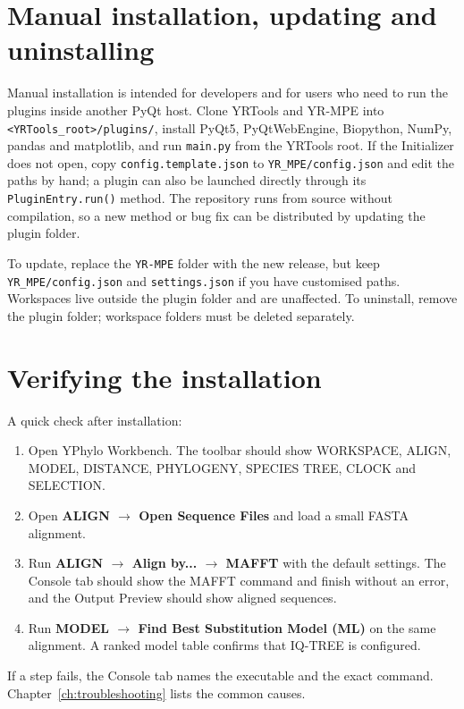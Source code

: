 \documentclass[10pt]{report}
\begin{document}
\section{Manual installation, updating and uninstalling}

Manual installation is intended for developers and for users who need to run
the plugins inside another PyQt host. Clone YRTools and YR-MPE into
\texttt{<YRTools\_root>/plugins/}, install PyQt5, PyQtWebEngine, Biopython,
NumPy, pandas and matplotlib, and run \texttt{main.py} from the YRTools root.
If the Initializer does not open, copy \texttt{config.template.json} to
\texttt{YR\_MPE/config.json} and edit the paths by hand; a plugin can also be
launched directly through its \texttt{PluginEntry.run()} method. The repository
runs from source without compilation, so a new method or bug fix can be
distributed by updating the plugin folder.

To update, replace the \texttt{YR-MPE} folder with the new release, but keep
\texttt{YR\_MPE/config.json} and \texttt{settings.json} if you have customised
paths. Workspaces live outside the plugin folder and are unaffected. To
uninstall, remove the plugin folder; workspace folders must be deleted
separately.

\section{Verifying the installation}

A quick check after installation:

\begin{enumerate}
  \item Open YPhylo Workbench. The toolbar should show WORKSPACE, ALIGN,
        MODEL, DISTANCE, PHYLOGENY, SPECIES TREE, CLOCK and SELECTION.
  \item Open \textbf{ALIGN $\rightarrow$ Open Sequence Files} and load a small
        FASTA alignment.
  \item Run \textbf{ALIGN $\rightarrow$ Align by... $\rightarrow$ MAFFT} with
        the default settings. The Console tab should show the MAFFT command and
        finish without an error, and the Output Preview should show aligned
        sequences.
  \item Run \textbf{MODEL $\rightarrow$ Find Best Substitution Model (ML)} on
        the same alignment. A ranked model table confirms that IQ-TREE is
        configured.
\end{enumerate}

If a step fails, the Console tab names the executable and the exact command.
Chapter~\ref{ch:troubleshooting} lists the common causes.
\end{document}
